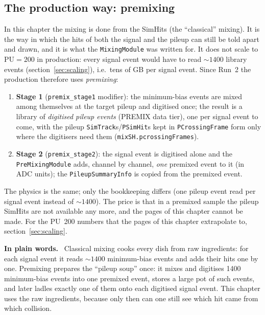 \documentclass[11pt,a4paper]{article}
\newcommand{\code}[1]{\texttt{#1}}
\newenvironment{plainwords}[1][In plain words]{%
  \par\medskip\noindent\setlength{\fboxsep}{6pt}\setlength{\fboxrule}{0.6pt}%
  \begin{lrbox}{\plainbox}\begin{minipage}{\dimexpr\textwidth-2\fboxsep-2\fboxrule\relax}\small
  \textbf{\textcolor{plainrule}{#1.}}\ \ignorespaces}{%
  \end{minipage}\end{lrbox}\noindent\fcolorbox{plainrule}{plainbg}{\usebox{\plainbox}}\par\medskip}
\begin{document}
\subsection{The production way: premixing}
\label{sec:premix}

In this chapter the mixing is done from the SimHits (the ``classical'' mixing). It is the way in which the
hits of both the signal and the pileup can still be told apart and drawn, and it is what the
\code{MixingModule} was written for. It does not scale to $\mathrm{PU}=200$ in production: every signal event
would have to read $\sim 1400$ library events (section~\ref{sec:scaling}), i.e.\ tens of GB per signal event.
Since Run~2 the production therefore uses \emph{premixing}:
\begin{enumerate}
\item \textbf{Stage 1} (\code{premix\_stage1} modifier): the minimum-bias events are mixed among themselves
  at the target pileup and digitised once; the result is a library of \emph{digitised pileup events}
  (PREMIX data tier), one per signal event to come, with the pileup \code{SimTrack}s/\code{PSimHit}s kept in
  \code{PCrossingFrame} form only where the digitisers need them (\code{mixSH.pcrossingFrames}).
\item \textbf{Stage 2} (\code{premix\_stage2}): the signal event is digitised alone and the
  \code{PreMixingModule} adds, channel by channel, \emph{one} premixed event to it (in ADC units); the
  \code{PileupSummaryInfo} is copied from the premixed event.
\end{enumerate}
The physics is the same; only the bookkeeping differs (one pileup event read per signal event instead of
$\sim 1400$). The price is that in a premixed sample the pileup SimHits are not available any more, and the
pages of this chapter cannot be made. For the PU~200 numbers that the pages of this chapter extrapolate to,
section~\ref{sec:scaling}.

\begin{plainwords}
Classical mixing cooks every dish from raw ingredients: for each signal event it reads $\sim1400$
minimum-bias events and adds their hits one by one. Premixing prepares the ``pileup soup'' once: it mixes
and digitises 1400 minimum-bias events into one premixed event, stores a large pot of such events, and later
ladles exactly one of them onto each digitised signal event. This chapter uses the raw ingredients, because
only then can one still see which hit came from which collision.
\end{plainwords}
\end{document}
